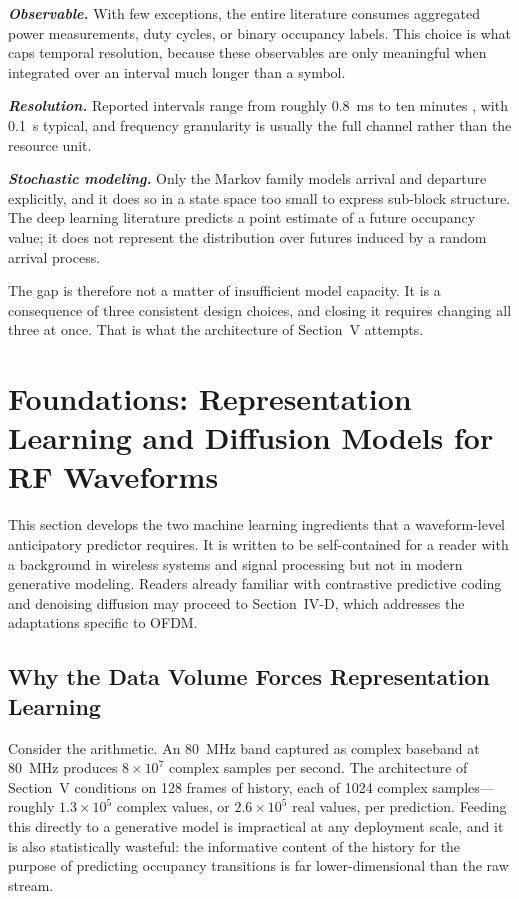 \documentclass[lettersize,journal]{IEEEtran}
\begin{document}
\emph{\textbf{Observable.}} With few exceptions, the entire literature consumes
aggregated power measurements, duty cycles, or binary occupancy labels.
This choice is what caps temporal resolution, because these observables
are only meaningful when integrated over an interval much longer than a
symbol.

\emph{\textbf{Resolution.}} Reported intervals range from roughly 0.8~ms
\cite{Umebayashi2023} to ten minutes \cite{Li2021}, with 0.1~s
\cite{Chirov2023} typical, and frequency granularity is usually the full
channel rather than the resource unit.

\emph{\textbf{Stochastic modeling.}} Only the Markov family models arrival and
departure explicitly, and it does so in a state space too small to
express sub-block structure. The deep learning literature predicts a
point estimate of a future occupancy value; it does not represent the
distribution over futures induced by a random arrival process.

The gap is therefore not a matter of insufficient model capacity. It is
a consequence of three consistent design choices, and closing it
requires changing all three at once. That is what the architecture of
Section~V attempts.

\section{\textbf{Foundations: Representation Learning and Diffusion Models for RF Waveforms}}

This section develops the two machine learning ingredients that a
waveform-level anticipatory predictor requires. It is written to be
self-contained for a reader with a background in wireless systems and
signal processing but not in modern generative modeling. Readers already
familiar with contrastive predictive coding and denoising diffusion may
proceed to Section~IV-D, which addresses the adaptations specific to
OFDM.

\subsection{\textbf{Why the Data Volume Forces Representation Learning}}
Consider the arithmetic. An 80~MHz band captured as complex baseband at
80~MHz produces $8\times10^{7}$ complex samples per second. The
architecture of Section~V conditions on 128 frames of history, each of
1024 complex samples---roughly $1.3\times10^{5}$ complex values, or
$2.6\times10^{5}$ real values, per prediction. Feeding this directly to
a generative model is impractical at any deployment scale, and it is
also statistically wasteful: the informative content of the history for
the purpose of predicting occupancy transitions is far
lower-dimensional than the raw stream.
\end{document}
